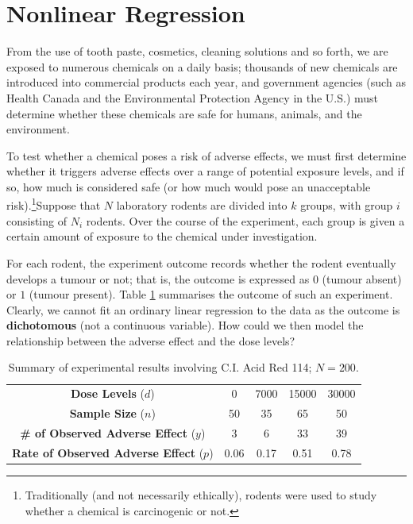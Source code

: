 \section{Nonlinear Regression}
From the use of tooth paste, cosmetics, cleaning solutions and so forth, we are exposed to numerous chemicals on a daily basis; thousands of new chemicals are introduced into commercial products each year, and government agencies (such as Health Canada and the Environmental Protection Agency in the U.S.) must determine whether these chemicals are safe for humans, animals, and the environment. \par To test whether a chemical poses a risk of adverse effects, we must first determine whether it triggers adverse effects over a range of potential exposure levels, and if so, how much is considered safe (or how much would pose an unacceptable risk).\footnote{Traditionally (and not necessarily ethically), rodents were used to study whether a chemical is carcinogenic or not.}\newl  Suppose that $N$ laboratory rodents are divided into $k$ groups, with group $i$ consisting of $N_{i}$ rodents. Over the course of the experiment, each group is given a certain amount of exposure to the chemical under investigation. \par For each rodent, the experiment outcome  records whether the  rodent eventually develops a tumour or not; that is, the outcome is expressed as $0$ (tumour absent) or $1$ (tumour present). \newl Table \ref{tab:SA8} summarises the outcome of such an experiment. \newl  Clearly, we cannot fit an ordinary linear regression to the data as the outcome is \textbf{dichotomous} (not a continuous variable). How could we then model the relationship between the adverse effect and the dose levels?
     \begin{table}[!t]
         \centering
         \begin{tabular}{c | c c c c}
         \hline
        \textbf{Dose Levels} ($d$) & 0 & 7000 & 15000 & 30000\\
        \textbf{Sample Size} ($n$) & 50 & 35 & 65 & 50\\
        \textbf{\# of Observed Adverse Effect} ($y$) & 3 & 6 & 33 &39\\
        \textbf{Rate of Observed Adverse Effect} ($p$) & 0.06 & 0.17 & 0.51 & 0.78\\
        \hline
         \end{tabular}
         \caption[\small Summary of experimental results involving C.I. Acid Red 114]{\small Summary of experimental results involving C.I. Acid Red 114; $N=200$.}
         \label{tab:SA8}
     \end{table}
